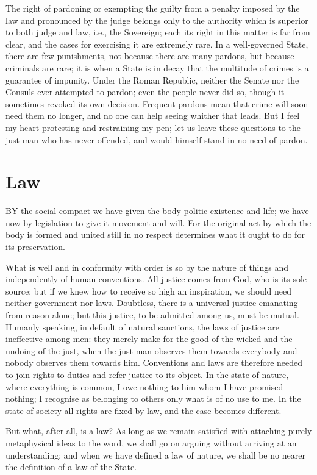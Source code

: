 \documentclass[12pt]{report}
\begin{document}
The right of pardoning or exempting the guilty from a penalty imposed by the law and pronounced by the judge belongs only to the authority which is superior to both judge and law, i.e., the Sovereign; each its right in this matter is far from clear, and the cases for exercising it are extremely rare. In a well-governed State, there are few punishments, not because there are many pardons, but because criminals are rare; it is when a State is in decay that the multitude of crimes is a guarantee of impunity. Under the Roman Republic, neither the Senate nor the Consuls ever attempted to pardon; even the people never did so, though it sometimes revoked its own decision. Frequent pardons mean that crime will soon need them no longer, and no one can help seeing whither that leads. But I feel my heart protesting and restraining my pen; let us leave these questions to the just man who has never offended, and would himself stand in no need of pardon.

\section{Law}
BY the social compact we have given the body politic existence and life; we have now by legislation to give it movement and will. For the original act by which the body is formed and united still in no respect determines what it ought to do for its preservation.

What is well and in conformity with order is so by the nature of things and independently of human conventions. All justice comes from God, who is its sole source; but if we knew how to receive so high an inspiration, we should need neither government nor laws. Doubtless, there is a universal justice emanating from reason alone; but this justice, to be admitted among us, must be mutual. Humanly speaking, in default of natural sanctions, the laws of justice are ineffective among men: they merely make for the good of the wicked and the undoing of the just, when the just man observes them towards everybody and nobody observes them towards him. Conventions and laws are therefore needed to join rights to duties and refer justice to its object. In the state of nature, where everything is common, I owe nothing to him whom I have promised nothing; I recognise as belonging to others only what is of no use to me. In the state of society all rights are fixed by law, and the case becomes different.

But what, after all, is a law? As long as we remain satisfied with attaching purely metaphysical ideas to the word, we shall go on arguing without arriving at an understanding; and when we have defined a law of nature, we shall be no nearer the definition of a law of the State.
\end{document}

